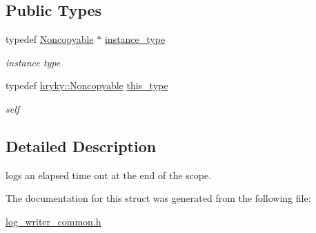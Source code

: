 \subsection*{Public Types}
\begin{DoxyCompactItemize}
\item 
\hypertarget{classhryky_1_1_noncopyable_aaf87abb55f700af85ecb0895f6178821}{typedef \hyperlink{classhryky_1_1_noncopyable}{Noncopyable} $\ast$ \hyperlink{classhryky_1_1_noncopyable_aaf87abb55f700af85ecb0895f6178821}{instance\-\_\-type}}\label{classhryky_1_1_noncopyable_aaf87abb55f700af85ecb0895f6178821}

\begin{DoxyCompactList}\small\item\em instance type \end{DoxyCompactList}\item 
\hypertarget{classhryky_1_1_noncopyable_acf13ad1c98a76247a561dff514979da5}{typedef \hyperlink{classhryky_1_1_noncopyable}{hryky\-::\-Noncopyable} \hyperlink{classhryky_1_1_noncopyable_acf13ad1c98a76247a561dff514979da5}{this\-\_\-type}}\label{classhryky_1_1_noncopyable_acf13ad1c98a76247a561dff514979da5}

\begin{DoxyCompactList}\small\item\em self \end{DoxyCompactList}\end{DoxyCompactItemize}


\subsection{Detailed Description}
logs an elapsed time out at the end of the scope. 

The documentation for this struct was generated from the following file\-:\begin{DoxyCompactItemize}
\item 
\hyperlink{log__writer__common_8h}{log\-\_\-writer\-\_\-common.\-h}\end{DoxyCompactItemize}
